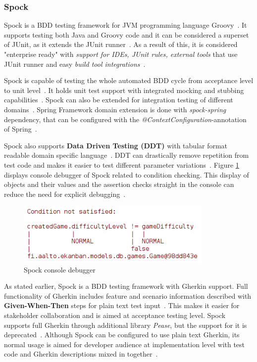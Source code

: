     \subsubsection{Spock}
    Spock is a BDD testing framework for JVM programming language Groovy~\cite{kapelonis2016java}. It supports
    testing both Java and Groovy code and it can be considered a superset of JUnit, as it extends the JUnit runner~\cite{spock}.
    As a result of this, it is considered "enterprise ready" with \textit{support for IDEs, JUnit rules, external tools} that use
    JUnit runner and easy \textit{build tool integrations}~\cite{kapelonis2016java}.

    Spock is capable of testing the whole automated BDD cycle from acceptance level to unit level~\cite{kapelonis2016java}.
    It holds unit test support with integrated mocking and stubbing capabilities~\cite{spock}.
    Spock can also be extended for integration testing of different domains~\cite{kapelonis2016java}.
    Spring Framework domain extension is done with \textit{spock-spring} dependency, that can be configured with
    the \textit{@ContextConfiguration}-annotation of Spring~\cite{springintegration}.

    Spock also supports \textbf{Data Driven Testing (DDT)} with tabular format readable
    domain specific language~\cite{spock}.
    DDT can drastically remove repetition from test code and makes it easier to test different parameter
    variations~\cite{kapelonis2016java}.
    Figure \ref{fig:spock-debug} displays console debugger of Spock related to
    condition checking. This display of objects and their values and the assertion checks straight in the console
    can reduce the need for explicit debugging~\cite{kapelonis2016java}.
    \begin{figure}[ht]
      \begin{center}
        \includegraphics[width=9.5cm]{images/spock-debug.png}
        \caption{Spock console debugger}
        \label{fig:spock-debug}
      \end{center}
    \end{figure}

    As stated earlier, Spock is a BDD testing framework with Gherkin support.
    Full functionality of Gherkin includes feature and scenario information described
    with \textbf{Given-When-Then} steps for plain text test input~\cite{gherkin}. This makes it easier for stakeholder collaboration
    and is aimed at acceptance testing level.
    Spock supports full Gherkin through additional library \textit{Pease}, but the support for it is deprecated~\cite{spock-pease}.
    Although Spock can be configured to use plain text Gherkin, its normal usage is aimed for developer audience at implementation
    level with test code and Gherkin descriptions mixed in together~\cite{okolnychyi2016study}.

